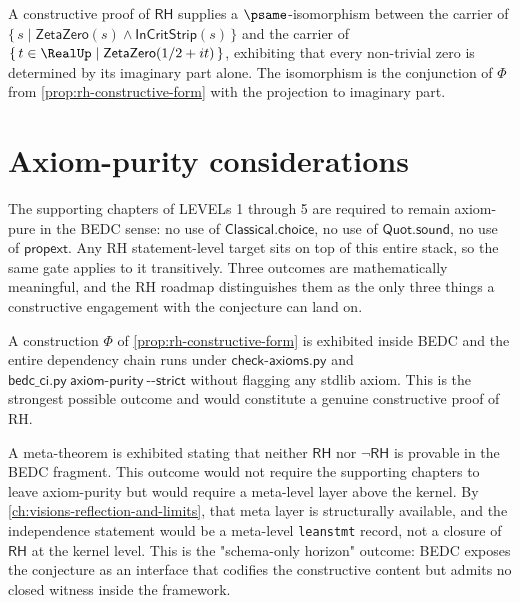\begin{theorem}
\label{thm:rh-witness-critical-line-restriction}
A constructive proof of $\mathsf{RH}$ supplies a $\psame$-isomorphism between the carrier of $\{\, s \mid \mathsf{ZetaZero}(s) \wedge \mathsf{InCritStrip}(s) \,\}$ and the carrier of $\{\, t \in \RealUp \mid \mathsf{ZetaZero}(1/2 + it) \,\}$, exhibiting that every non-trivial zero is determined by its imaginary part alone. The isomorphism is the conjunction of $\Phi$ from \autoref{prop:rh-constructive-form} with the projection to imaginary part.
\end{theorem}

\section{Axiom-purity considerations}
\label{sec:rh-axiom-purity}

The supporting chapters of LEVELs 1 through 5 are required to remain axiom-pure in the BEDC sense: no use of $\mathsf{Classical.choice}$, no use of $\mathsf{Quot.sound}$, no use of $\mathsf{propext}$. Any RH statement-level target sits on top of this entire stack, so the same gate applies to it transitively. Three outcomes are mathematically meaningful, and the RH roadmap distinguishes them as the only three things a constructive engagement with the conjecture can land on.

\begin{remark}
\label{rem:rh-outcome-provable}
A construction $\Phi$ of \autoref{prop:rh-constructive-form} is exhibited inside BEDC and the entire dependency chain runs under $\mathsf{check\text{-}axioms.py}$ and $\mathsf{bedc\_ci.py\ axiom\text{-}purity\ \text{-}\text{-}strict}$ without flagging any stdlib axiom. This is the strongest possible outcome and would constitute a genuine constructive proof of RH.
\end{remark}

\begin{remark}
\label{rem:rh-outcome-independence}
A meta-theorem is exhibited stating that neither $\mathsf{RH}$ nor $\neg\mathsf{RH}$ is provable in the BEDC fragment. This outcome would not require the supporting chapters to leave axiom-purity but would require a meta-level layer above the kernel. By \autoref{ch:visions-reflection-and-limits}, that meta layer is structurally available, and the independence statement would be a meta-level \texttt{leanstmt} record, not a closure of $\mathsf{RH}$ at the kernel level. This is the "schema-only horizon" outcome: BEDC exposes the conjecture as an interface that codifies the constructive content but admits no closed witness inside the framework.
\end{remark}

